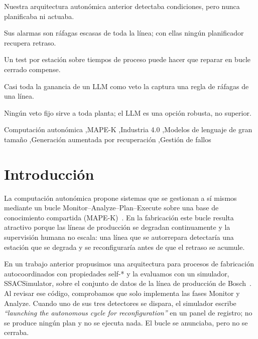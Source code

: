 \documentclass[preprint,11pt]{elsarticle}
\begin{document}
\begin{frontmatter}
\begin{abstract}
\end{abstract}

\begin{highlights}
\item Nuestra arquitectura autonómica anterior detectaba condiciones, pero nunca planificaba ni actuaba.
\item Sus alarmas son ráfagas escasas de toda la línea; con ellas ningún planificador recupera retraso.
\item Un test por estación sobre tiempos de proceso puede hacer que reparar en bucle cerrado compense.
\item Casi toda la ganancia de un LLM como veto la captura una regla de ráfagas de una línea.
\item Ningún veto fijo sirve a toda planta; el LLM es una opción robusta, no superior.
\end{highlights}

\begin{keyword}
Computación autonómica \sep MAPE-K \sep Industria 4.0 \sep Modelos de lenguaje de gran tamaño \sep Generación aumentada por recuperación \sep Gestión de fallos
\end{keyword}

\end{frontmatter}

\section{Introducción}
\label{sec:intro}

La computación autonómica propone sistemas que se gestionan a sí mismos mediante un bucle Monitor--Analyze--Plan--Execute sobre una base de conocimiento compartida (MAPE-K)~\cite{kephart2003vision,weyns2020introduction}. En la fabricación este bucle resulta atractivo porque las líneas de producción se degradan continuamente y la supervisión humana no escala: una línea que se autorrepara detectaría una estación que se degrada y se reconfiguraría antes de que el retraso se acumule.

En un trabajo anterior propusimos una arquitectura para procesos de fabricación autocoordinados con propiedades self-* y la evaluamos con un simulador, SSACSimulator, sobre el conjunto de datos de la línea de producción de Bosch~\cite{sanchez2020selfstar,sanchez2020jii}. Al revisar ese código, comprobamos que solo implementa las fases Monitor y Analyze. Cuando uno de sus tres detectores se dispara, el simulador escribe \emph{``launching the autonomous cycle for reconfiguration''} en un panel de registro; no se produce ningún plan y no se ejecuta nada. El bucle se anunciaba, pero no se cerraba.
\end{document}
